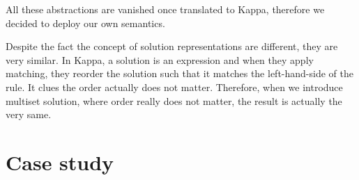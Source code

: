 \documentclass{elsarticle}
\begin{document}
All these abstractions are vanished once translated to Kappa, therefore we decided to deploy our own semantics.

Despite the fact the concept of solution representations are different, they are very similar. In Kappa, a solution is an expression and when they apply matching, they reorder the solution such that it matches the left-hand-side of the rule. It clues the order actually does not matter. Therefore, when we introduce multiset solution, where order really does not matter, the result is actually the very same.

\section{Case study}


\newpage



\end{document}
